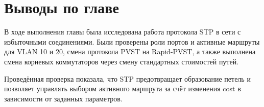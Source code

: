 \section{Выводы по главе}
В ходе выполнения главы была исследована работа протокола STP в сети с избыточными соединениями. 
Были проверены роли портов и активные маршруты для VLAN 10 и 20, смена протокола PVST на Rapid-PVST, а также выполнена смена корневых коммутаторов через смену стандартных стоимостей путей. 

Проведённая проверка показала, что STP предотвращает образование петель и позволяет управлять выбором активного маршрута за счёт изменения cost в зависимости от заданных параметров.

\endinput
